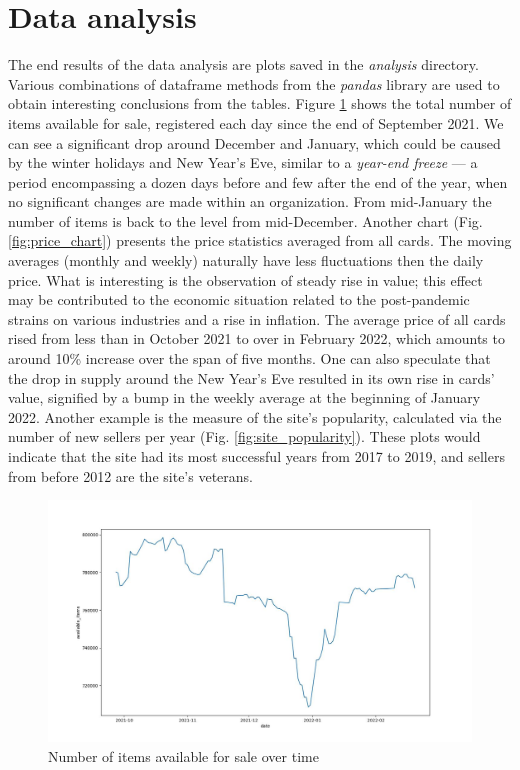 \section{Data analysis}
The end results of the data analysis are plots saved in the \textit{analysis} directory. Various combinations of dataframe methods from the \textit{pandas} library are used to obtain interesting conclusions from the tables. Figure \ref{fig:available_items} shows the total number of items available for sale, registered each day since the end of September 2021. We can see a significant drop around December and January, which could be caused by the winter holidays and New Year's Eve, similar to a \textit{year-end freeze} --- a period encompassing a dozen days before and few after the end of the year, when no significant changes are made within an organization. From mid-January the number of items is back to the level from mid-December. Another chart (Fig. \ref{fig:price_chart}) presents the price statistics averaged from all cards. The moving averages (monthly and weekly) naturally have less fluctuations then the daily price. What is interesting is the observation of steady rise in value; this effect may be contributed to the economic situation related to the post-pandemic strains on various industries and a rise in inflation. The average price of all cards rised from less than  in October 2021 to over  in February 2022, which amounts to around 10\% increase over the span of five months. One can also speculate that the drop in supply around the New Year's Eve resulted in its own rise in cards' value, signified by a bump in the weekly average at the beginning of January 2022. Another example is the measure of the site's popularity, calculated via the number of new sellers per year (Fig. \ref{fig:site_popularity}). These plots would indicate that the site had its most successful years from 2017 to 2019, and sellers from before 2012 are the site's veterans. \par

\begin{figure}
    \centering
    \includegraphics[width=\textwidth]{figures/available_items.jpg}
    \caption{Number of items available for sale over time}
    \label{fig:available_items}
\end{figure}

